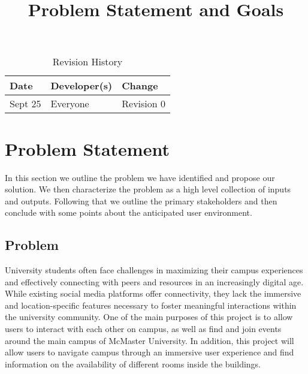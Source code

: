 \documentclass{article}
\title{Problem Statement and Goals\\\progname}
\author{\authname}
\date{}
\begin{document}
\maketitle

\begin{table}[hp]
\caption{Revision History} \label{TblRevisionHistory}
\begin{tabularx}{\textwidth}{llX}
\toprule
\textbf{Date} & \textbf{Developer(s)} & \textbf{Change}\\
\midrule
Sept 25 & Everyone & Revision 0\\
\bottomrule
\end{tabularx}
\end{table}

\section{Problem Statement}

In this section we outline the problem we have identified and propose our solution. We then characterize the problem as a high level collection of inputs and outputs. Following that we outline the primary stakeholders and then conclude with some points about the anticipated user environment.

\subsection{Problem}

\quad University students often face challenges in maximizing their campus experiences and effectively connecting with peers and resources in an increasingly digital age. While existing social media platforms offer connectivity, they lack the immersive and location-specific features necessary to foster meaningful interactions within the university community. One of the main purposes of this project is to allow users to interact with each other on campus, as well as find and join events around the main campus of McMaster University. In addition, this project will allow users to navigate campus through an immersive user experience and find information on the availability of different rooms inside the buildings.
\end{document}
